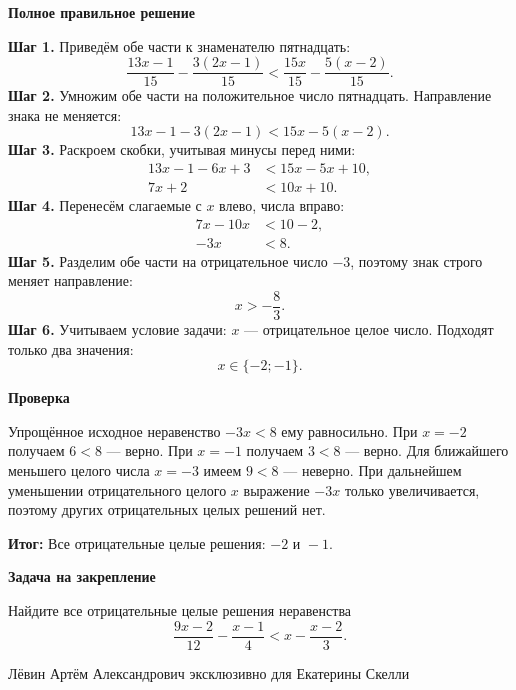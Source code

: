 \documentclass[12pt,a4paper]{article}
\newcommand{\result}{\textcolor{teal!60!black}{\textbf{Итог:}}}
\newcommand{\reviewhead}[1]{\medskip\textbf{#1}\par}
\begin{document}
\reviewhead{Полное правильное решение}
\textbf{Шаг 1.} Приведём обе части к знаменателю пятнадцать:
\[
\frac{13x-1}{15}-\frac{3(2x-1)}{15}
<\frac{15x}{15}-\frac{5(x-2)}{15}.
\]
\textbf{Шаг 2.} Умножим обе части на положительное число пятнадцать. Направление знака не меняется:
\[
13x-1-3(2x-1)<15x-5(x-2).
\]
\textbf{Шаг 3.} Раскроем скобки, учитывая минусы перед ними:
\begin{align*}
13x-1-6x+3&<15x-5x+10,\\
7x+2&<10x+10.
\end{align*}
\textbf{Шаг 4.} Перенесём слагаемые с $x$ влево, числа вправо:
\begin{align*}
7x-10x&<10-2,\\
-3x&<8.
\end{align*}
\textbf{Шаг 5.} Разделим обе части на отрицательное число $-3$, поэтому знак строго меняет направление:
\[
x>-\frac83.
\]
\textbf{Шаг 6.} Учитываем условие задачи: $x$ --- отрицательное целое число. Подходят только два значения:
\[
\boxed{x\in\{-2;-1\}}.
\]

\reviewhead{Проверка}
Упрощённое исходное неравенство $-3x<8$ ему равносильно. При $x=-2$ получаем $6<8$ --- верно. При $x=-1$ получаем $3<8$ --- верно. Для ближайшего меньшего целого числа $x=-3$ имеем $9<8$ --- неверно. При дальнейшем уменьшении отрицательного целого $x$ выражение $-3x$ только увеличивается, поэтому других отрицательных целых решений нет.

\result{} Все отрицательные целые решения: $\boxed{-2\text{ и }-1}$.

\reviewhead{Задача на закрепление}
Найдите все отрицательные целые решения неравенства
\[
\frac{9x-2}{12}-\frac{x-1}{4}<x-\frac{x-2}{3}.
\]

\vfill
\begin{center}
\footnotesize Лёвин Артём Александрович эксклюзивно для Екатерины Скелли
\end{center}
\end{document}
